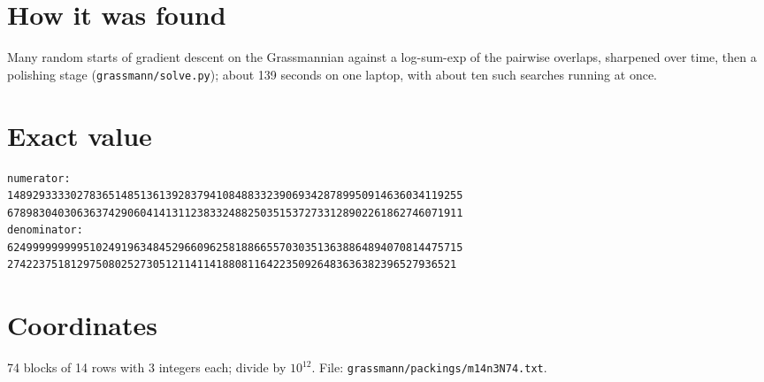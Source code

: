 \documentclass[11pt,a4paper]{article}
\begin{document}
\section{How it was found}
Many random starts of gradient descent on the Grassmannian against a log-sum-exp of the pairwise overlaps, sharpened over time, then a polishing stage (\texttt{grassmann/solve.py}); about 139 seconds on one laptop, with about ten such searches running at once.


\appendix
\section{Exact value}
{\small
\begin{verbatim}
numerator:
148929333302783651485136139283794108488332390693428789950914636034119255
678983040306363742906041413112383324882503515372733128902261862746071911
denominator:
624999999999510249196348452966096258188665570303513638864894070814475715
27422375181297508025273051211411418808116422350926483636382396527936521
\end{verbatim}}

\section{Coordinates}
74 blocks of 14 rows with 3 integers each; divide by $10^{12}$. File: \texttt{grassmann/packings/m14n3N74.txt}.
{\tiny
\begin{multicols}{3}
\end{multicols}}
\end{document}
